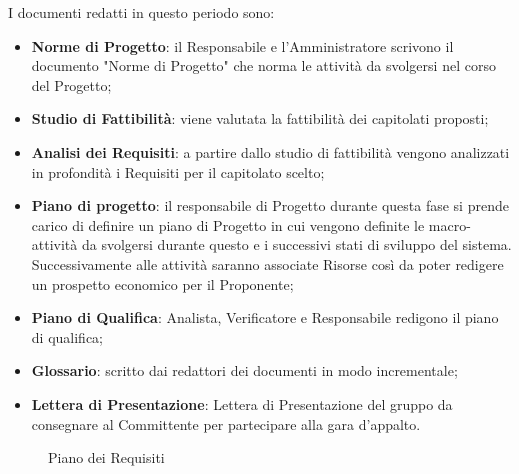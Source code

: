 {{	I documenti redatti in questo periodo sono:
	\begin{itemize}
		\item \textbf{Norme di Progetto}: il Responsabile e l'Amministratore scrivono il documento "Norme di Progetto" che norma le attività da svolgersi nel corso del Progetto;
		\item \textbf{Studio di Fattibilità}: viene valutata la fattibilità dei capitolati proposti;
		\item \textbf{Analisi dei Requisiti}: a partire dallo studio di fattibilità vengono analizzati in profondità i Requisiti per il capitolato scelto;
		\item \textbf{Piano di progetto}: il responsabile di Progetto durante questa fase si prende carico di definire un piano di Progetto in cui vengono definite le macro-attività da svolgersi durante questo e i successivi stati di sviluppo del sistema. Successivamente alle attività saranno associate Risorse così da poter redigere un prospetto economico per il Proponente;
		\item \textbf{Piano di Qualifica}: Analista, Verificatore e Responsabile redigono il piano di qualifica;
		\item \textbf{Glossario}: scritto dai redattori dei documenti in modo incrementale;
		\item \textbf{Lettera di Presentazione}: Lettera di Presentazione del gruppo da consegnare al Committente per partecipare alla gara d'appalto.
	\end{itemize}

	\begin{landscape}
		\thispagestyle{empty}
		\begin{figure}[H]
			\parbox[c][\textwidth][s]{\linewidth}{
			\centering
			\vspace*{\fill}
			\vspace*{\fill}
			\caption{Piano dei Requisiti}
			\label{fig:pianorequisiti}
			}
		\end{figure}
	\end{landscape}

}}
